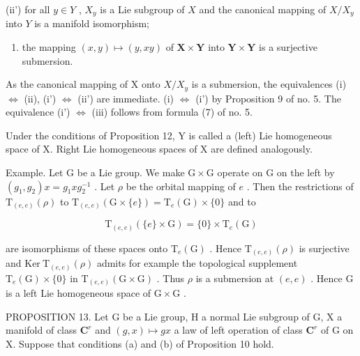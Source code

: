 (ii') for all \(y \in Y\) , \(X_y\) is a Lie subgroup of \(X\) and the canonical mapping of \(X / X_y\) into \(Y\) is a manifold isomorphism;

\begin{enumerate}
\def\labelenumi{(\roman{enumi})}
\setcounter{enumi}{2}
\tightlist
\item
  the mapping \((x,y)\mapsto (y,xy)\) of \(\mathbf{X}\times \mathbf{Y}\) into \(\mathbf{Y}\times \mathbf{Y}\) is a surjective submersion.
\end{enumerate}

As the canonical mapping of X onto \(X/X_{y}\) is a submersion, the equivalences (i) \(\Leftrightarrow\) (ii), (i') \(\Leftrightarrow\) (ii') are immediate. (i) \(\Leftrightarrow\) (i') by Proposition 9 of no. 5. The equivalence (i') \(\Leftrightarrow\) (iii) follows from formula (7) of no. 5.

Under the conditions of Proposition 12, Y is called a (left) Lie homogeneous space of X. Right Lie homogeneous spaces of X are defined analogously.

Example. Let \(\mathrm{G}\) be a Lie group. We make \(\mathrm{G} \times \mathrm{G}\) operate on \(\mathrm{G}\) on the left by \((g_1, g_2)x = g_1xg_2^{-1}\) . Let \(\rho\) be the orbital mapping of \(e\) . Then the restrictions of \(\mathrm{T}_{(e,e)}(\rho)\) to \(\mathrm{T}_{(e,e)}(\mathrm{G} \times \{e\}) = \mathrm{T}_e(\mathrm{G}) \times \{0\}\) and to

\[
\mathrm{T} _ {(e, e)} (\{e \} \times \mathrm{G}) = \{0 \} \times \mathrm{T} _ {e} (\mathrm{G})
\]

are isomorphisms of these spaces onto \(\mathrm{T}_{e}(\mathrm{G})\) . Hence \(\mathrm{T}_{(e,e)}(\rho)\) is surjective and \(\mathrm{Ker~T}_{(e,e)}(\rho)\) admits for example the topological supplement \(\mathrm{T}_{e}(\mathrm{G}) \times \{0\}\) in \(\mathrm{T}_{(e,e)}(\mathrm{G} \times \mathrm{G})\) . Thus \(\rho\) is a submersion at \((e,e)\) . Hence G is a left Lie homogeneous space of \(\mathrm{G} \times \mathrm{G}\) .

PROPOSITION 13. Let G be a Lie group, H a normal Lie subgroup of G, X a manifold of class \(\mathbf{C}^r\) and \((g,x)\mapsto gx\) a law of left operation of class \(\mathbf{C}^r\) of G on X. Suppose that conditions (a) and (b) of Proposition 10 hold.


